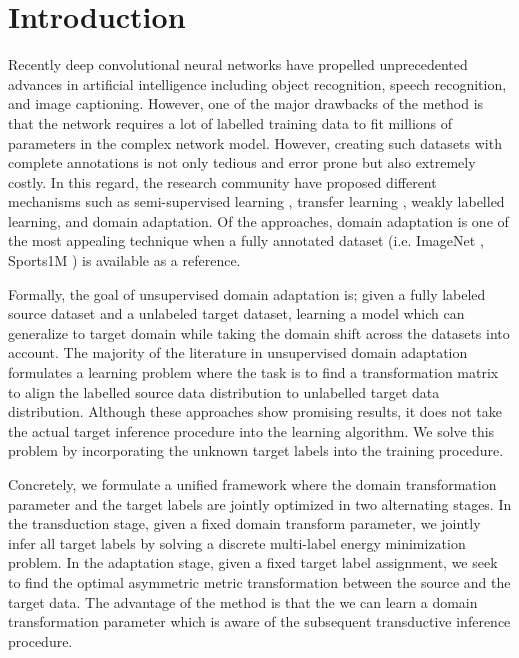 \documentclass{article}
\begin{document}
\section{Introduction}
\label{intro}
Recently deep convolutional neural networks \cite{alexnet, vggnet, googlenet} have propelled unprecedented advances in artificial intelligence including object recognition, speech recognition, and image captioning. However, one of the major drawbacks of the method is that the network requires a lot of labelled training data to fit millions of parameters in the complex network model. However, creating such datasets with complete annotations is not only tedious and error prone but also extremely costly. In this regard, the research community have proposed different mechanisms such as semi-supervised learning \cite{semisup1,semisup2,semisup3}, transfer learning \cite{transfer1, transfer2}, weakly labelled learning, and domain adaptation. Of the approaches, domain adaptation is one of the most appealing technique when a fully annotated dataset (i.e. ImageNet \cite{ImageNet}, Sports1M \cite{sports1m}) is available as a reference. 

Formally, the goal of unsupervised domain adaptation is; given a fully labeled source dataset and a unlabeled target dataset, learning a model which can generalize to target domain while taking the domain shift across the datasets into account. The majority of the literature \cite{gong12, baochen15, fernando13, baochen16, tommasi13} in unsupervised domain adaptation formulates a learning problem where the task is to find a transformation matrix to align the labelled source data distribution to unlabelled target data distribution. Although these approaches show promising results, it does not take the actual target inference procedure into the learning algorithm. We solve this problem by incorporating the unknown target labels into the training procedure.

Concretely, we formulate a unified framework where the domain transformation parameter and the target labels are jointly optimized in two alternating stages. In the transduction stage, given a fixed domain transform parameter, we jointly infer all target labels by solving a discrete multi-label energy minimization problem. In the adaptation stage, given a fixed target label assignment, we seek to find the optimal asymmetric metric transformation between the source and the target data. The advantage of the method is that the we can learn a domain transformation parameter which is aware of the subsequent transductive inference procedure. 
\end{document}
